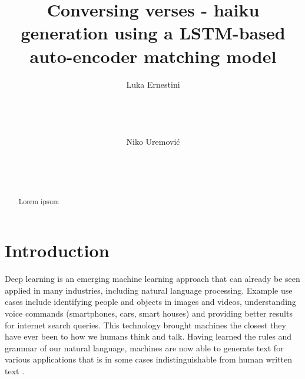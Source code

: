 \documentclass{acm_proc_article-sp}
\begin{document}
\title{Conversing verses - haiku generation using a LSTM-based auto-encoder matching model}

\author{
\alignauthor
Luka Ernestini\\
       \\
       \\
       \\

\alignauthor
Niko Uremović\\
       \\
       \\
       \\
}

\maketitle
\begin{abstract}

Lorem ipsum

\end{abstract}




\section{Introduction}

Deep learning is an emerging machine learning approach that can already be seen applied in many industries, including natural language processing. Example use cases include identifying people and objects in images and videos, understanding voice commands (smartphones, cars, smart houses) and providing better results for internet search queries. This technology brought machines the closest they have ever been to how we humans think and talk. Having learned the rules and grammar of our natural language, machines are now able to generate text for various applications that is in some cases indistinguishable from human written text \cite{pawade2018story}.
\end{document}
